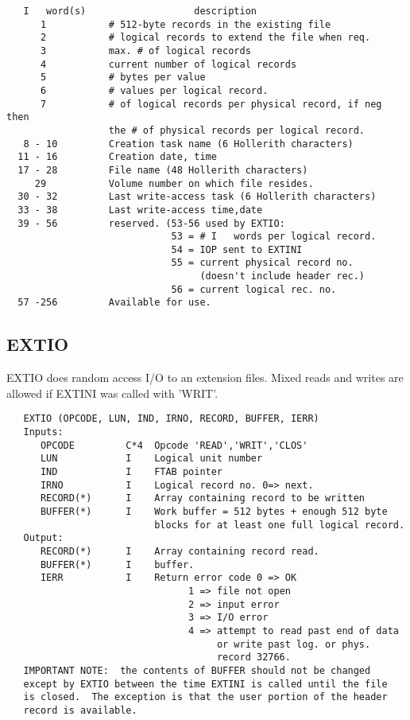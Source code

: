 \begin{verbatim}
   I   word(s)                   description
      1           # 512-byte records in the existing file
      2           # logical records to extend the file when req.
      3           max. # of logical records
      4           current number of logical records
      5           # bytes per value
      6           # values per logical record.
      7           # of logical records per physical record, if neg then
                  the # of physical records per logical record.
   8 - 10         Creation task name (6 Hollerith characters)
  11 - 16         Creation date, time
  17 - 28         File name (48 Hollerith characters)
     29           Volume number on which file resides.
  30 - 32         Last write-access task (6 Hollerith characters)
  33 - 38         Last write-access time,date
  39 - 56         reserved. (53-56 used by EXTIO:
                             53 = # I   words per logical record.
                             54 = IOP sent to EXTINI
                             55 = current physical record no.
                                  (doesn't include header rec.)
                             56 = current logical rec. no.
  57 -256         Available for use.
\end{verbatim}

\subsection{EXTIO}
EXTIO does random access I/O to an extension files.  Mixed reads
and writes are allowed if EXTINI was called with 'WRIT'.
\begin{verbatim}
   EXTIO (OPCODE, LUN, IND, IRNO, RECORD, BUFFER, IERR)
   Inputs:
      OPCODE         C*4  Opcode 'READ','WRIT','CLOS'
      LUN            I    Logical unit number
      IND            I    FTAB pointer
      IRNO           I    Logical record no. 0=> next.
      RECORD(*)      I    Array containing record to be written
      BUFFER(*)      I    Work buffer = 512 bytes + enough 512 byte
                          blocks for at least one full logical record.
   Output:
      RECORD(*)      I    Array containing record read.
      BUFFER(*)      I    buffer.
      IERR           I    Return error code 0 => OK
                                1 => file not open
                                2 => input error
                                3 => I/O error
                                4 => attempt to read past end of data
                                     or write past log. or phys.
                                     record 32766.
   IMPORTANT NOTE:  the contents of BUFFER should not be changed
   except by EXTIO between the time EXTINI is called until the file
   is closed.  The exception is that the user portion of the header
   record is available.
\end{verbatim}

